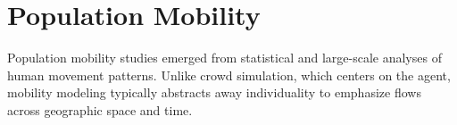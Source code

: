 \section{Population Mobility}

Population mobility studies emerged from statistical and large-scale analyses of human movement patterns. Unlike crowd simulation, which centers on the agent, mobility modeling typically abstracts away individuality to emphasize flows across geographic space and time.

